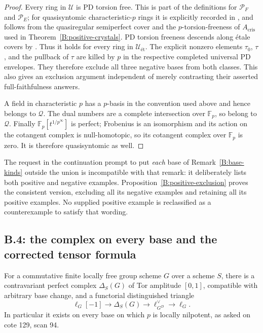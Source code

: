 \begin{proof}
Every ring in $\mathcal U$ is PD torsion free. This is part of
the definitions for $\mathcal P_F$ and $\mathcal P_E$; for
quasisyntomic characteristic-$p$ rings it is explicitly recorded in
\cite[Introduction, paragraph discussing Ansch\"utz--Le Bras]{B:LauDivided},
and follows from the quasiregular semiperfect cover and the
$p$-torsion-freeness of $A_{\mathrm{cris}}$ used in
Theorem~\ref{B:positive-crystals}. PD torsion freeness descends
along \'etale covers by
\cite[Lemma 4.7 and Corollary 4.8]{B:LauDivided}.
Thus it holds for every ring in $\mathcal U_{\text{ét}}$.
The explicit nonzero elements $\tau_0$, $\tau$, and the pullback
of $\tau$ are killed by $p$ in the respective completed universal
PD envelopes. They therefore exclude all three negative bases
from both classes. This also gives an exclusion argument independent
of merely contrasting their asserted full-faithfulness answers.

A field in characteristic $p$ has a $p$-basis in the convention used
above and hence belongs to $\mathcal Q$. The dual numbers are a
complete intersection over $\mathbb F_p$, so belong to $\mathcal Q$.
Finally $\mathbb F_p[t^{1/p^\infty}]$ is perfect; Frobenius is an
isomorphism and its action on the cotangent complex is null-homotopic,
so its cotangent complex over $\mathbb F_p$ is zero. It is therefore
quasisyntomic as well.
\end{proof}

The request in the continuation prompt to put \emph{each} base of
Remark~\ref{B:base-kinds} outside the union is incompatible with
that remark: it deliberately lists both positive and negative
examples. Proposition~\ref{B:positive-exclusion} proves the consistent
version, excluding all its negative examples and retaining all its
positive examples. No supplied positive example is reclassified as
a counterexample to satisfy that wording.

\subsection{B.4: the complex on every base and the corrected tensor formula}

\begin{theorem}
\label{B:Delta}
For a commutative finite locally free group scheme $G$ over a scheme
$S$, there is a contravariant perfect complex $\Delta_S(G)$ of Tor
amplitude $[0,1]$, compatible with arbitrary base change, and a
functorial distinguished triangle
\begin{equation}\label{B:Delta-triangle}
 \ell_G[-1]\longrightarrow\Delta_S(G)
 \longrightarrow\ell_{G^D}^{\vee}\longrightarrow\ell_G.
\end{equation}
In particular it exists on every base on which $p$ is locally
nilpotent, as asked on cote 129, scan 94.
\end{theorem}

